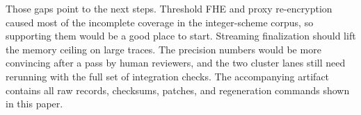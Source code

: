 \documentclass[sigconf,nonacm]{acmart}
\begin{document}
Those gaps point to the next steps. Threshold FHE and proxy re-encryption
caused most of the incomplete coverage in the integer-scheme corpus, so
supporting them would be a good place to start. Streaming finalization should
lift the memory ceiling on large traces. The precision numbers would be more
convincing after a pass by human reviewers, and the two cluster lanes still
need rerunning with the full set of integration checks. The accompanying
artifact contains all raw records, checksums, patches, and regeneration
commands shown in this paper.



\end{document}

